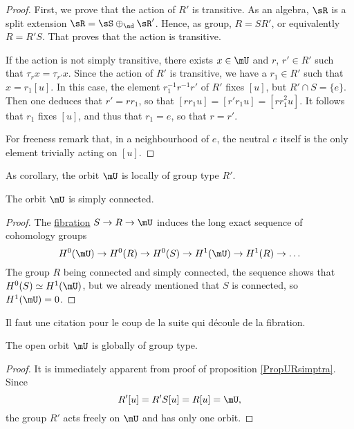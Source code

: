 \begin{proof}

First, we prove that the action of $R'$ is transitive. As an algebra, $\sR$ is a split extension $\sR=\sS\oplus_{\ad}\sR'$.  Hence, as group, $R=S R'$, or equivalently $R=R'S$. That proves that the action is transitive.  

If the action is not simply transitive, there exists $x\in\mU$ and $r$, $r'\in R'$ such that $\tau_rx=\tau_{r'}x$. Since the action of $R'$ is transitive, we have a $r_1\in R'$ such that $x=r_1[u]$. In this case, the element $r_1^{-1}r^{-1}r'$ of $R'$ fixes $[u]$, but $R'\cap S=\{ e \}$. Then one deduces that $r'=rr_1$, so that $[rr_1u]=[r'r_1u]=[rr_1^2u]$. It follows that $r_1$ fixes $[u]$, and thus that $r_1=e$, so that $r=r'$.

For freeness remark that, in a neighbourhood of $e$, the neutral $e$ itself is the only element trivially acting on $[u]$.

\end{proof}

As corollary, the orbit $\mU$ is locally of group type $R'$.

\begin{proposition}		\label{PropmUsimpl}
The orbit $\mU$ is simply connected.
\end{proposition}

\begin{proof}
	The \href{http://en.wikipedia.org/wiki/Fibration}{fibration} $S\to R\to\mU$ induces the long exact sequence of cohomology groups
	\[ 
	  H^{0}(\mU)\to H^{0}(R)\to H^{0}(S)\to H^{1}(\mU)\to H^{1}(R)\to\ldots
	\]
	The group $R$ being connected and simply connected, the sequence shows that $H^{0}(S)\simeq H^{1}(\mU)$, but we already mentioned that $S$ is connected, so $H^1(\mU)=0$.
\end{proof}

\begin{probleme}
Il faut une citation pour le coup de la suite qui découle de la fibration.
\label{ProbFibra}
\end{probleme}


\begin{corollary}
The open orbit $\mU$ is globally of group type.
\label{CormUgloGppasSym}
\end{corollary}

\begin{proof}
It is immediately apparent from proof of proposition \ref{PropURsimptra}. Since
\[ 
  R'[u]=R'S[u]=R[u]=\mU,
\]
the group $R'$ acts freely on $\mU$ and has only one orbit.
\end{proof}

